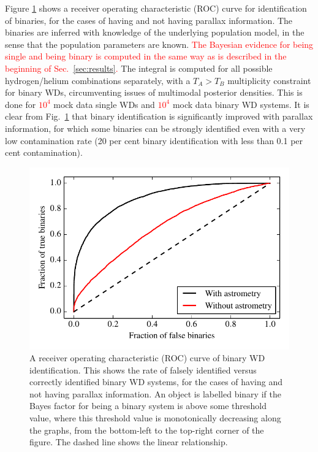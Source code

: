\documentclass[fleqn,usenatbib]{mnras}
\newcommand{\changes}[1]{\textcolor{red}{#1}}
\newcommand{\Teff}{T}
\begin{document}
Figure \ref{fig:ROC_binaries} shows a receiver operating characteristic (ROC) curve for identification of binaries, for the cases of having and not having parallax information. The binaries are inferred with knowledge of the underlying population model, in the sense that the population parameters are known. \changes{The Bayesian evidence for being single and being binary is computed in the same way as is described in the beginning of Sec.~\ref{sec:results}.} The integral is computed for all possible hydrogen/helium combinations separately, with a $\Teff_A>\Teff_B$ multiplicity constraint for binary WDs, circumventing issues of multimodal posterior densities. This is done for \changes{$10^4$} mock data single WDs and \changes{$10^4$} mock data binary WD systems. It is clear from Fig.~\ref{fig:ROC_binaries} that binary identification is significantly improved with parallax information, for which some binaries can be strongly identified even with a very low contamination rate (20 per cent binary identification with less than 0.1 per cent contamination).
\begin{figure}
	\includegraphics[width=\columnwidth]{ROC_binaries.pdf}
    \caption{A receiver operating characteristic (ROC) curve of binary WD identification. This shows the rate of falsely identified versus correctly identified binary WD systems, for the cases of having and not having parallax information. An object is labelled binary if the Bayes factor for being a binary system is above some threshold value, where this threshold value is monotonically decreasing along the graphs, from the bottom-left to the top-right corner of the figure. The dashed line shows the linear relationship.}
    \label{fig:ROC_binaries}
\end{figure}
\end{document}
